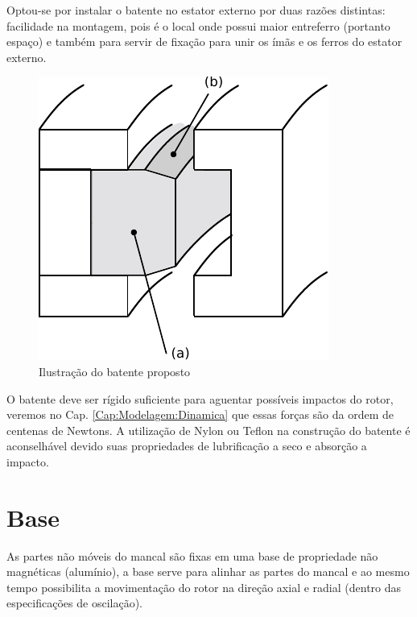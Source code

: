 Optou-se por instalar o batente no estator externo por duas razões distintas: facilidade na montagem, pois  é o local onde possui maior entreferro (portanto espaço) e também para servir de fixação para unir os ímãs e os ferros do estator externo. 

\begin{figure}[th!]
\centering
\includegraphics[width=0.4\linewidth]{./Figs/mancais/mancal_batente_corte}
\caption{Ilustração do batente proposto}
\label{fig:mancal:batente:corte}
\end{figure}


O batente deve ser rígido suficiente para aguentar possíveis impactos do rotor, veremos no Cap. \ref{Cap:Modelagem:Dinamica} que essas forças são da ordem de centenas de Newtons. A utilização de Nylon ou Teflon na construção do batente é aconselhável \citep[Cap. 13]{Schweitzer2009} devido suas propriedades de lubrificação a seco e absorção a impacto.

\section{Base}

As partes não móveis do mancal são fixas em uma base de propriedade não magnéticas (alumínio), a base serve para alinhar as partes do mancal e ao mesmo tempo possibilita a movimentação do rotor na direção axial e radial (dentro das especificações de oscilação). 

%


